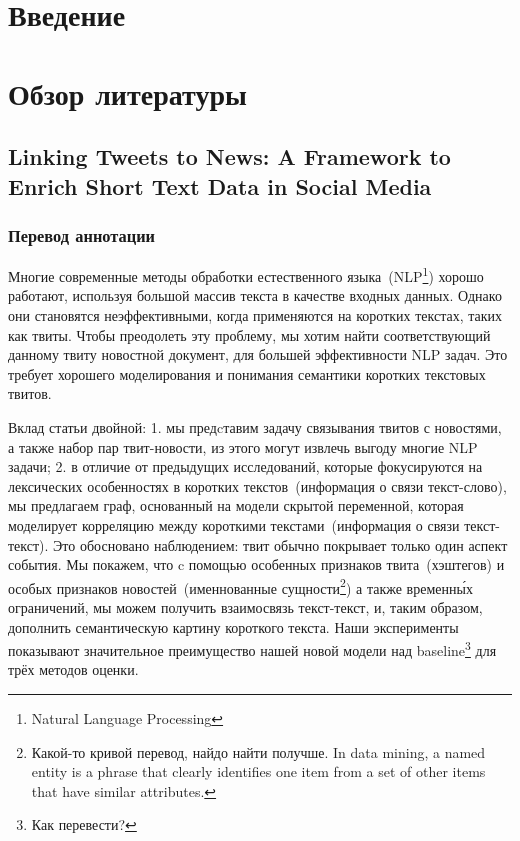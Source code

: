 \documentclass[12pt,a4paper,oneside]{extarticle}
\begin{document}


\tableofcontents

\clearpage

\section*{Введение}

\section{Обзор литературы}

    \subsection{Linking Tweets to News: A Framework to Enrich Short Text Data in Social Media}
        \subsubsection{Перевод аннотации}
        Многие современные методы обработки естественного языка~(NLP\footnote{Natural Language Processing}) хорошо работают, используя большой массив текста в качестве входных данных.
        Однако они становятся неэффективными, когда применяются на коротких текстах, таких как твиты.
        Чтобы преодолеть эту проблему, мы хотим найти соответствующий данному твиту новостной документ, для большей эффективности NLP задач.
        Это требует хорошего моделирования и понимания семантики коротких текстовых твитов.

        Вклад статьи двойной:
        1. мы предcтавим задачу связывания твитов с новостями, а также набор пар твит-новости, из этого могут извлечь выгоду многие NLP задачи;
        2. в отличие от предыдущих исследований, которые фокусируются на лексических особенностях в коротких текстов~(информация о связи текст-слово), мы предлагаем граф, основанный на модели скрытой переменной, которая моделирует корреляцию между короткими текстами~(информация о связи текст-текст).
        Это обосновано наблюдением: твит обычно покрывает только один аспект события.
        Мы покажем, что c помощью особенных признаков твита~(хэштегов) и особых признаков новостей~(именнованные сущности\footnote{Какой-то кривой перевод, найдо найти получше. In data mining, a named entity is a phrase that clearly identifies one item from a set of other items that have similar attributes.}) а также временн\'{ы}х ограничений, мы можем получить взаимосвязь текст-текст, и, таким образом, дополнить семантическую картину короткого текста.
        Наши эксперименты показывают значительное преимущество нашей новой модели над baseline\footnote{Как перевести?} для трёх методов оценки.
\end{document}
